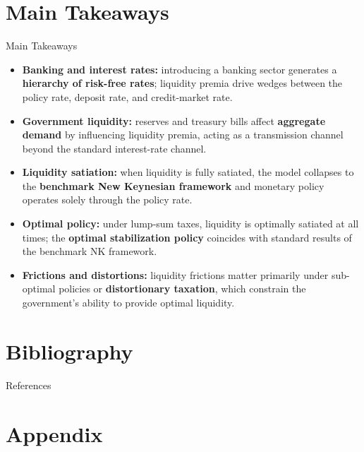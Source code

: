 \documentclass[11pt,aspectratio=169]{beamer}
\begin{document}
\section{Main Takeaways}
\begin{frame}{Main Takeaways}
\small

\begin{itemize}
  \item \textbf{Banking and interest rates:} introducing a banking sector generates a \textbf{hierarchy of risk-free rates}; liquidity premia drive wedges between the policy rate, deposit rate, and credit-market rate.

  \item \textbf{Government liquidity:} reserves and treasury bills affect \textbf{aggregate demand} by influencing liquidity premia, acting as a transmission channel beyond the standard interest-rate channel.

  \item \textbf{Liquidity satiation:} when liquidity is fully satiated, the model collapses to the \textbf{benchmark New Keynesian framework} and monetary policy operates solely through the policy rate.

  \item \textbf{Optimal policy:} under lump-sum taxes, liquidity is optimally satiated at all times; the \textbf{optimal stabilization policy} coincides with standard results of the benchmark NK framework.

  \item \textbf{Frictions and distortions:} liquidity frictions matter primarily under sub-optimal policies or \textbf{distortionary taxation}, which constrain the government's ability to provide optimal liquidity.
\end{itemize}

\end{frame}


\section{Bibliography}

\begin{frame}{References}
\printbibliography
\end{frame}

\appendix
\section{Appendix}
\end{document}
